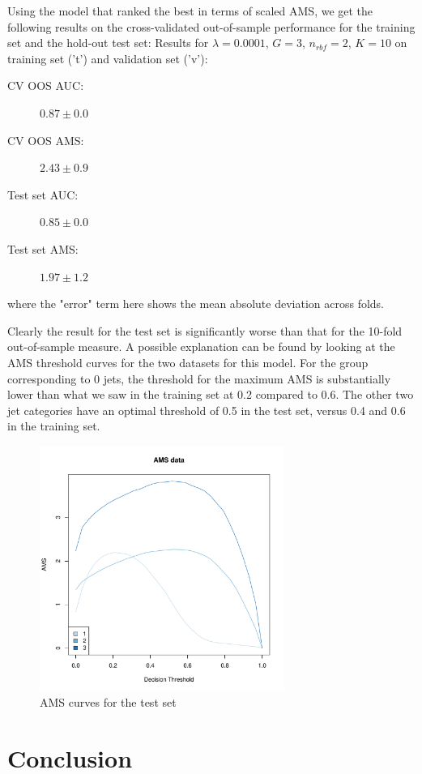 Using the model that ranked the best in terms of scaled AMS, we get the following results on the cross-validated out-of-sample performance for the training set and the hold-out test set:
\newline
Results for $\lambda=0.0001$, $G=3$, $n_{rbf}=2$, $K=10$ on training set ('t') and validation set ('v'):
\begin{description}
    \item[CV OOS AUC:] $0.87 \pm 0.0$
    \item[CV OOS AMS:] $2.43 \pm 0.9$
    \item[Test set AUC:] $0.85 \pm 0.0$
    \item[Test set AMS:] $1.97 \pm 1.2$
\end{description} 
where the "error" term here shows the mean absolute deviation across folds.

Clearly the result for the test set is significantly worse than that for the 10-fold out-of-sample measure. A possible explanation can be found by looking at the AMS threshold curves for the two datasets for this model. For the group corresponding to 0 jets, the threshold for the maximum AMS is substantially lower than what we saw in the training set at 0.2 compared to 0.6. The other two jet categories have an optimal threshold of 0.5 in the test set, versus 0.4 and 0.6 in the training set. 

\begin{figure}[h]
    \includegraphics[width=8cm]{validation-ams-curves.pdf}
    \caption{AMS curves for the test set}
\end{figure}

\section{Conclusion}
\label{conclusion}

\pagebreak 


{}


